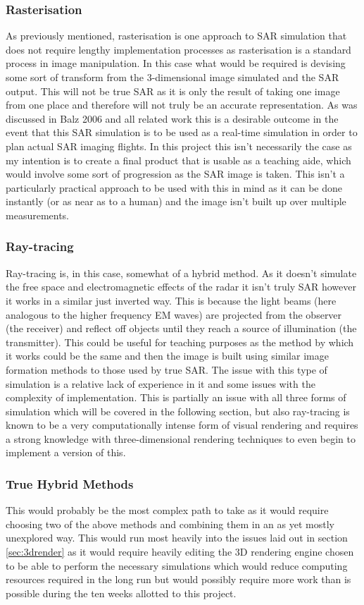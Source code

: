 \subsubsection{Rasterisation}
As previously mentioned, rasterisation is one approach to SAR simulation that does not require lengthy implementation processes as rasterisation is a standard process in image manipulation. In this case what would be required is devising some sort of transform from the 3-dimensional image simulated and the SAR output. This will not be true SAR as it is only the result of taking one image from one place and therefore will not truly be an accurate representation. As was discussed in Balz 2006 \cite{balzImprovedRealTimeSAR2006} and all related work this is a desirable outcome in the event that this SAR simulation is to be used as a real-time simulation in order to plan actual SAR imaging flights. In this project this isn't necessarily the case as my intention is to create a final product that is usable as a teaching aide, which would involve some sort of progression as the SAR image is taken. This isn't a particularly practical approach to be used with this in mind as it can be done instantly (or as near as to a human) and the image isn't built up over multiple measurements.
\subsubsection{Ray-tracing}
Ray-tracing is, in this case, somewhat of a hybrid method. As it doesn't simulate the free space and electromagnetic effects of the radar it isn't truly SAR however it works in a similar just inverted way. This is because the light beams (here analogous to the higher frequency EM waves) are projected from the observer (the receiver) and reflect off objects until they reach a source of illumination (the transmitter). This could be useful for teaching purposes as the method by which it works could be the same and then the image is built using similar image formation methods to those used by true SAR. The issue with this type of simulation is a relative lack of experience in it and some issues with the complexity of implementation. This is partially an issue with all three forms of simulation which will be covered in the following section, but also ray-tracing is known to be a very computationally intense form of visual rendering and requires a strong knowledge with three-dimensional rendering techniques to even begin to implement a version of this.
\subsubsection{True Hybrid Methods}
This would probably be the most complex path to take as it would require choosing two of the above methods and combining them in an as yet mostly unexplored way. This would run most heavily into the issues laid out in section \ref{sec:3drender} as it would require heavily editing the 3D rendering engine chosen to be able to perform the necessary simulations which would reduce computing resources required in the long run but would possibly require more work than is possible during the ten weeks allotted to this project.
